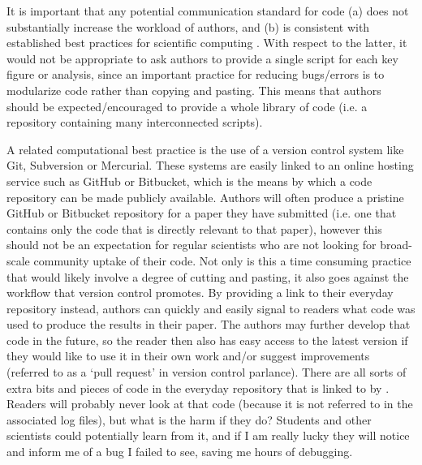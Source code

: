 It is important that any potential communication standard for code (a) does not substantially increase the workload of authors, and (b) is consistent with established best practices for scientific computing \citep{Wilson2014a}. With respect to the latter, it would not be appropriate to ask authors to provide a single script for each key figure or analysis, since an important practice for reducing bugs/errors is to modularize code rather than copying and pasting. This means that authors should be expected/encouraged to provide a whole library of code (i.e. a repository containing many interconnected scripts).

A related computational best practice is the use of a version control system like Git, Subversion or Mercurial. These systems are easily linked to an online hosting service such as GitHub or Bitbucket, which is the means by which a code repository can be made publicly available. Authors will often produce a pristine GitHub or Bitbucket repository for a paper they have submitted (i.e. one that contains only the code that is directly relevant to that paper), however this should not be an expectation for regular scientists who are not looking for broad-scale community uptake of their code. Not only is this a time consuming practice that would likely involve a degree of cutting and pasting, it also goes against the workflow that version control promotes. By providing a link to their everyday repository instead, authors can quickly and easily signal to readers what code was used to produce the results in their paper. The authors may further develop that code in the future, so the reader then also has easy access to the latest version if they would like to use it in their own work and/or suggest improvements (referred to as a `pull request' in version control parlance). There are all sorts of extra bits and pieces of code in the everyday repository that is linked to by \citet{Irving2015}. Readers will probably never look at that code (because it is not referred to in the associated log files), but what is the harm if they do? Students and other scientists could potentially learn from it, and if I am really lucky they will notice and inform me of a bug I failed to see, saving me hours of debugging.       

